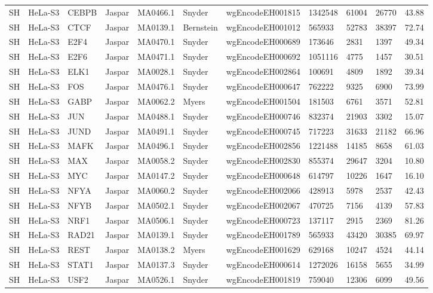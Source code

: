 {\begin{longtable}{p{0.2cm}p{1.1cm}p{1.0cm}p{1.0cm}p{1.0cm}p{1.0cm}p{2.3cm}p{1.0cm}p{0.8cm}p{0.8cm}p{0.8cm}}
SH & HeLa-S3 & CEBPB & Jaspar & MA0466.1 & Snyder & wgEncodeEH001815 & 1342548 & 61004 & 26770 & 43.88\\
SH & HeLa-S3 & CTCF & Jaspar & MA0139.1 & Bernstein & wgEncodeEH001012 & 565933 & 52783 & 38397 & 72.74\\
SH & HeLa-S3 & E2F4 & Jaspar & MA0470.1 & Snyder & wgEncodeEH000689 & 173646 & 2831 & 1397 & 49.34\\
SH & HeLa-S3 & E2F6 & Jaspar & MA0471.1 & Snyder & wgEncodeEH000692 & 1051116 & 4775 & 1457 & 30.51\\
SH & HeLa-S3 & ELK1 & Jaspar & MA0028.1 & Snyder & wgEncodeEH002864 & 100691 & 4809 & 1892 & 39.34\\
SH & HeLa-S3 & FOS & Jaspar & MA0476.1 & Snyder & wgEncodeEH000647 & 762222 & 9325 & 6900 & 73.99\\
SH & HeLa-S3 & GABP & Jaspar & MA0062.2 & Myers & wgEncodeEH001504 & 181503 & 6761 & 3571 & 52.81\\
SH & HeLa-S3 & JUN & Jaspar & MA0488.1 & Snyder & wgEncodeEH000746 & 832374 & 21903 & 3302 & 15.07\\
SH & HeLa-S3 & JUND & Jaspar & MA0491.1 & Snyder & wgEncodeEH000745 & 717223 & 31633 & 21182 & 66.96\\
SH & HeLa-S3 & MAFK & Jaspar & MA0496.1 & Snyder & wgEncodeEH002856 & 1221488 & 14185 & 8658 & 61.03\\
SH & HeLa-S3 & MAX & Jaspar & MA0058.2 & Snyder & wgEncodeEH002830 & 855374 & 29647 & 3204 & 10.80\\
SH & HeLa-S3 & MYC & Jaspar & MA0147.2 & Snyder & wgEncodeEH000648 & 614797 & 10226 & 1647 & 16.10\\
SH & HeLa-S3 & NFYA & Jaspar & MA0060.2 & Snyder & wgEncodeEH002066 & 428913 & 5978 & 2537 & 42.43\\
SH & HeLa-S3 & NFYB & Jaspar & MA0502.1 & Snyder & wgEncodeEH002067 & 470725 & 7156 & 4139 & 57.83\\
SH & HeLa-S3 & NRF1 & Jaspar & MA0506.1 & Snyder & wgEncodeEH000723 & 137117 & 2915 & 2369 & 81.26\\
SH & HeLa-S3 & RAD21 & Jaspar & MA0139.1 & Snyder & wgEncodeEH001789 & 565933 & 43420 & 30385 & 69.97\\
SH & HeLa-S3 & REST & Jaspar & MA0138.2 & Myers & wgEncodeEH001629 & 629168 & 10247 & 4524 & 44.14\\
SH & HeLa-S3 & STAT1 & Jaspar & MA0137.3 & Snyder & wgEncodeEH000614 & 1272026 & 16158 & 5655 & 34.99\\
SH & HeLa-S3 & USF2 & Jaspar & MA0526.1 & Snyder & wgEncodeEH001819 & 759040 & 12306 & 6099 & 49.56\\

\end{longtable}}
